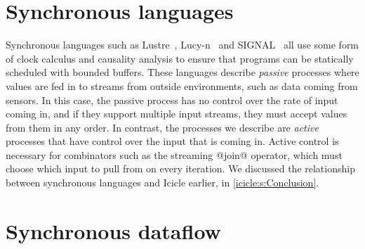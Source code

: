 \section{Synchronous languages}
\label{related/synchronous-languages}

Synchronous languages such as {\sc Lustre}~\cite{halbwachs1991synchronous}, Lucy-n~\cite{mandel2010lucy} and SIGNAL~\cite{le2003polychrony} all use some form of clock calculus and causality analysis to ensure that programs can be statically scheduled with bounded buffers.
These languages describe \emph{passive} processes where values are fed in to streams from outside environments, such as data coming from sensors.
In this case, the passive process has no control over the rate of input coming in, and if they support multiple input streams, they must accept values from them in any order.
In contrast, the processes we describe are \emph{active} processes that have control over the input that is coming in.
Active control is necessary for combinators such as the streaming @join@ operator, which must choose which input to pull from on every iteration.
We discussed the relationship between synchronous languages and Icicle earlier, in \cref{icicle:s:Conclusion}.

\section{Synchronous dataflow}
\label{related/synchronous-dataflow}

